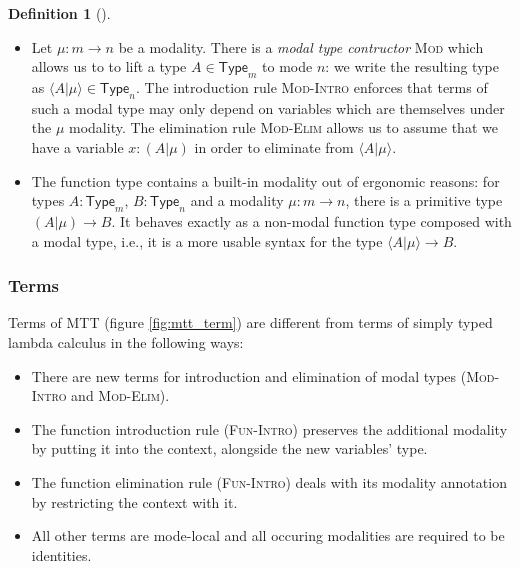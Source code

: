 \documentclass{scrartcl}
\theoremstyle{definition}
\newtheorem{definition}{Definition}
\theoremstyle{plain}
\begin{document}
\begin{definition}[{\cite[following Chapter 6.2]{gratzer2023syntax}}]
  \begin{itemize}
  \item Let $\mu : m \to n$ be a modality. There is a \textit{modal type contructor}
    \textsc{Mod} which allows us to to lift a type $A \in
    \textsf{Type}_m$ to mode $n$: we write the resulting type as $\langle A | \mu \rangle \in
    \textsf{Type}_n$. The introduction rule \textsc{Mod-Intro} enforces that
    terms of such a modal type may only depend on variables
    which are themselves under the $\mu$ modality. The elimination rule \textsc{Mod-Elim} allows
    us to assume that we have a variable $x : (A|\mu)$ in order to eliminate
    from $\langle A | \mu \rangle$.
  \item
    The function type contains a built-in modality out of ergonomic reasons: for
    types $A : \textsf{Type}_m$, $B : \textsf{Type}_n$ and a modality $\mu : m
    \to n$, there is a primitive type $(A | \mu)\to B$. It behaves exactly as a
    non-modal function type composed with a modal type, i.e., it is a more
    usable syntax for the type $\langle A | \mu \rangle \to B$.
  \end{itemize}

  \subsubsection*{Terms}
  Terms of MTT (figure \ref{fig:mtt_term}) are different from terms of simply
  typed lambda calculus in the following ways:
  \begin{itemize}
  \item There are new terms for introduction and elimination of modal types
    (\textsc{Mod-Intro} and \textsc{Mod-Elim}).
  \item The function introduction rule (\textsc{Fun-Intro}) preserves the
    additional modality by putting it into the context, alongside the new variables' type.
  \item The function elimination rule (\textsc{Fun-Intro}) deals with its modality annotation by
    restricting the context with it.
  \item All other terms are mode-local and all occuring modalities are required
    to be identities.
  \end{itemize}

\end{definition}
\end{document}
